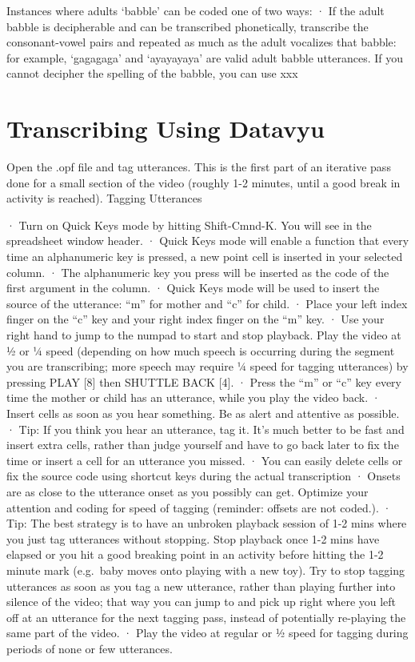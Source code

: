 \documentclass[
  12pt,
]{book}
\begin{document}
Instances where adults `babble' can be coded one of two ways:
· If the adult babble is decipherable and can be transcribed phonetically, transcribe the consonant-vowel pairs and repeated as much as the adult vocalizes that babble: for example, `gagagaga' and `ayayayaya' are valid adult babble utterances.
If you cannot decipher the spelling of the babble, you can use xxx

\hypertarget{transcribing-using-datavyu}{%
\section{Transcribing Using Datavyu}\label{transcribing-using-datavyu}}

Open the .opf file and tag utterances. This is the first part of an iterative pass done for a small section of the video (roughly 1-2 minutes, until a good break in activity is reached).
Tagging Utterances

· Turn on Quick Keys mode by hitting Shift-Cmnd-K. You will see in the spreadsheet window header.
· Quick Keys mode will enable a function that every time an alphanumeric key is pressed, a new point cell is inserted in your selected column.
· The alphanumeric key you press will be inserted as the code of the first argument in the column.
· Quick Keys mode will be used to insert the source of the utterance: ``m'' for mother and ``c'' for child.
· Place your left index finger on the ``c'' key and your right index finger on the ``m'' key.
· Use your right hand to jump to the numpad to start and stop playback. Play the video at ½ or ¼ speed (depending on how much speech is occurring during the segment you are transcribing; more speech may require ¼ speed for tagging utterances) by pressing PLAY {[}8{]} then SHUTTLE BACK {[}4{]}.
· Press the ``m'' or ``c'' key every time the mother or child has an utterance, while you play the video back.
· Insert cells as soon as you hear something. Be as alert and attentive as possible.
· Tip: If you think you hear an utterance, tag it. It's much better to be fast and insert extra cells, rather than judge yourself and have to go back later to fix the time or insert a cell for an utterance you missed.
· You can easily delete cells or fix the source code using shortcut keys during the actual transcription
· Onsets are as close to the utterance onset as you possibly can get. Optimize your attention and coding for speed of tagging (reminder: offsets are not coded.).
· Tip: The best strategy is to have an unbroken playback session of 1-2 mins where you just tag utterances without stopping. Stop playback once 1-2 mins have elapsed or you hit a good breaking point in an activity before hitting the 1-2 minute mark (e.g.~baby moves onto playing with a new toy). Try to stop tagging utterances as soon as you tag a new utterance, rather than playing further into silence of the video; that way you can jump to and pick up right where you left off at an utterance for the next tagging pass, instead of potentially re-playing the same part of the video.
· Play the video at regular or ½ speed for tagging during periods of none or few utterances.
\end{document}
